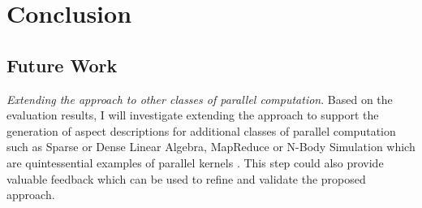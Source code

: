 \chapter{Conclusion}

\section{Future Work}

\emph{Extending the approach to other classes of parallel
  computation}.  Based on the evaluation results, I will investigate
extending the approach to support the generation of aspect
descriptions for additional classes of parallel computation such as
Sparse or Dense Linear Algebra, MapReduce or N-Body Simulation which
are quintessential examples of parallel kernels
\cite{Asanovic:Bodik:Catanzaro:Gebis:Husbands:Keutzer:Patterson:Plishker:Shalf:Williams:Yelick:2006}. This
step could also provide valuable feedback which can be used to refine
and validate the proposed approach.
